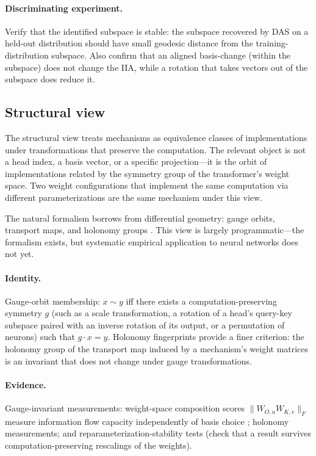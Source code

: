\documentclass{article}
\begin{document}
\paragraph{Discriminating experiment.}
Verify that the identified subspace is stable: the subspace recovered
by DAS on a held-out distribution should have small geodesic distance
from the training-distribution subspace.  Also confirm that
an aligned basis-change (within the subspace) does not change the IIA,
while a rotation that takes vectors out of the subspace does reduce it.

\subsection{Structural view}

The structural view treats mechanisms as equivalence classes of
implementations under transformations that preserve the computation.
The relevant object is not a head index, a basis vector, or a specific
projection---it is the orbit of implementations related by the symmetry
group of the transformer's weight space.  Two weight configurations
that implement the same computation via different parameterizations are
the same mechanism under this view.

The natural formalism borrows from differential geometry:
gauge orbits, transport maps, and holonomy groups
\citep{nakahara2003}.  This view is largely programmatic---the
formalism exists, but systematic empirical application to neural
networks does not yet.

\paragraph{Identity.}
Gauge-orbit membership: $x \sim y$ iff there exists a computation-preserving
symmetry $g$ (such as a scale transformation, a rotation of a head's
query-key subspace paired with an inverse rotation of its output, or a
permutation of neurons) such that $g \cdot x = y$.  Holonomy fingerprints
provide a finer criterion: the holonomy group of the transport map
induced by a mechanism's weight matrices is an invariant that does not
change under gauge transformations.

\paragraph{Evidence.}
Gauge-invariant measurements: weight-space composition scores
$\|W_{O,u} W_{K,v}\|_F$ measure information flow capacity independently
of basis choice \citep{elhage2021,merullo2024}; holonomy measurements; and
reparameterization-stability tests (check that a result survives
computation-preserving rescalings of the weights).
\end{document}

